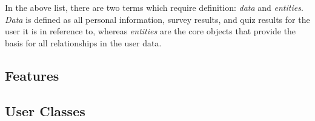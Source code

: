 \documentclass[letterpaper,12pt]{report}
\begin{document}
In the above list, there are two terms which require definition: \emph{data} and \emph{entities}. \emph{Data} is defined as all personal information, survey results, and quiz results for the user it is in reference to, whereas \emph{entities} are the core objects that provide the basis for all relationships in the user data.

\subsection*{Features}



\subsection*{User Classes}
\end{document}
